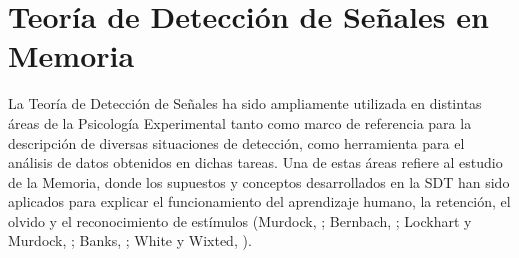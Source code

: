 \begin{itemize}
\end{itemize}


















\section{Teoría de Detección de Señales en Memoria}

La Teoría de Detección de Señales ha sido ampliamente utilizada en distintas áreas de la Psicología Experimental tanto como marco de referencia para la descripción de diversas situaciones de detección, como herramienta para el análisis de datos obtenidos en dichas tareas. Una de estas áreas refiere al estudio de la Memoria, donde los supuestos y conceptos desarrollados en la SDT han sido aplicados para explicar el funcionamiento del aprendizaje humano, la retención, el olvido y el reconocimiento de estímulos (Murdock, \citeyear{Murdock1965}; Bernbach, \citeyear{Bernbach1967}; Lockhart y Murdock, \citeyear{Lockhart1970}; Banks, \citeyear{Banks1970}; White y Wixted, \citeyear{White1999}).\\


